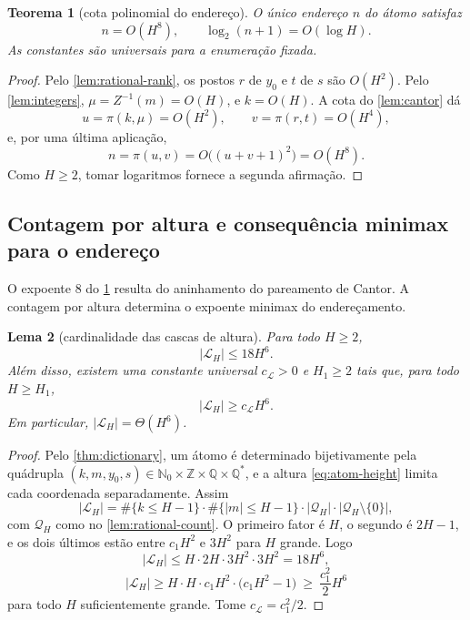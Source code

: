 \documentclass[11pt,a4paper]{article}
\newtheorem{theorem}{Teorema}[section]
\newtheorem{lemma}[theorem]{Lema}
\theoremstyle{definition}
\theoremstyle{remark}
\newcommand{\Nzero}{\mathbb{N}_0}
\newcommand{\Qstar}{\mathbb{Q}^{\!*}}
\newcommand{\Library}{\mathcal{L}}
\begin{document}
\begin{theorem}[cota polinomial do endereço]\label{thm:index-bound}
O único endereço $n$ do átomo satisfaz
\begin{equation}
 n=O(H^8),\qquad \log_2(n+1)=O(\log H).
 \label{eq:index-bound}
\end{equation}
As constantes são universais para a enumeração fixada.
\end{theorem}

\begin{proof}
Pelo \cref{lem:rational-rank}, os postos $r$ de $y_0$ e $t$ de $s$ são $O(H^2)$. Pelo \cref{lem:integers}, $\mu=Z^{-1}(m)=O(H)$, e $k=O(H)$. A cota do \cref{lem:cantor} dá
\[
 u=\pi(k,\mu)=O(H^2),\qquad v=\pi(r,t)=O(H^4),
\]
e, por uma última aplicação,
\[
 n=\pi(u,v)=O\bigl((u+v+1)^2\bigr)=O(H^8).
\]
Como $H\ge2$, tomar logaritmos fornece a segunda afirmação.
\end{proof}

\subsection{Contagem por altura e consequência minimax para o endereço}

O expoente $8$ do \cref{thm:index-bound} resulta do aninhamento do pareamento de Cantor. A contagem por altura determina o expoente minimax do endereçamento.

\begin{lemma}[cardinalidade das cascas de altura]\label{lem:atom-count}
Para todo $H\ge2$,
\begin{equation}
 |\Library_H|\le18H^6.
 \label{eq:atom-count-upper}
\end{equation}
Além disso, existem uma constante universal $c_\Library>0$ e $H_1\ge2$ tais
que, para todo $H\ge H_1$,
\begin{equation}
 |\Library_H|\ge c_\Library H^6.
 \label{eq:atom-count}
\end{equation}
Em particular, $|\Library_H|=\Theta(H^6)$.
\end{lemma}

\begin{proof}
Pelo \cref{thm:dictionary}, um átomo é determinado bijetivamente pela quádrupla $(k,m,y_0,s)\in\Nzero\times\mathbb{Z}\times\mathbb{Q}\times\Qstar$, e a altura \eqref{eq:atom-height} limita cada coordenada separadamente. Assim
\[
 |\Library_H|=\#\{k\le H-1\}\cdot\#\{|m|\le H-1\}\cdot|\mathcal{Q}_H|\cdot|\mathcal{Q}_H\setminus\{0\}|,
\]
com $\mathcal{Q}_H$ como no \cref{lem:rational-count}. O primeiro fator é $H$, o segundo é $2H-1$, e os dois últimos estão entre $c_1H^2$ e $3H^2$ para $H$ grande. Logo
\[
 |\Library_H|\le H\cdot 2H\cdot 3H^2\cdot 3H^2=18H^6,
\]
\[
 |\Library_H|\ge H\cdot H\cdot c_1H^2\cdot\bigl(c_1H^2-1\bigr)\ \ge\ \frac{c_1^2}{2}H^6
\]
para todo $H$ suficientemente grande. Tome $c_\Library=c_1^2/2$.
\end{proof}
\end{document}
